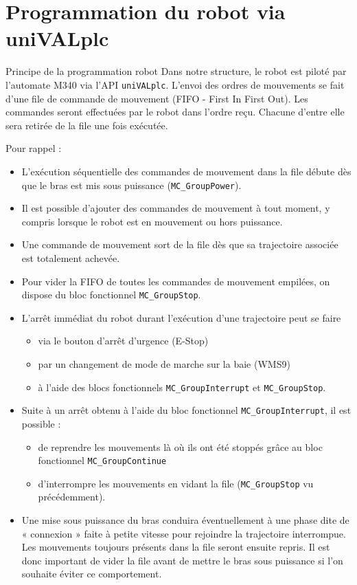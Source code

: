 \section{Programmation du robot via uniVALplc}
\begin{UPSTIinfor}{Principe de la programmation robot}
    Dans notre structure, le robot est piloté par l'automate M340 via l'API \texttt{uniVALplc}. L'envoi des ordres de mouvements se fait d'une file de commande de mouvement (FIFO - First In First Out). Les commandes seront effectuées par le robot dans l'ordre reçu. Chacune d'entre elle sera retirée de la file une fois exécutée.

    Pour rappel :
    \begin{itemize}
        \item L'exécution séquentielle des commandes de mouvement dans la file débute dès que le bras est mis sous puissance (\texttt{MC\_GroupPower}).
        \item Il est possible d'ajouter des commandes de mouvement à tout moment, y compris lorsque le robot est en mouvement ou hors puissance.
        \item Une commande de mouvement sort de la file dès que sa trajectoire associée est totalement achevée.
        \item Pour vider la FIFO de toutes les commandes de mouvement empilées, on dispose du bloc fonctionnel \texttt{MC\_GroupStop}.
        \item L'arrêt immédiat du robot durant l'exécution d'une trajectoire peut se faire
              \begin{itemize}
                  \item via le bouton d'arrêt d'urgence (E-Stop)
                  \item par un changement de mode de marche sur la baie (WMS9)
                  \item à l'aide des blocs fonctionnels \texttt{MC\_GroupInterrupt} et \texttt{MC\_GroupStop}.
              \end{itemize}
        \item Suite à un arrêt obtenu à l'aide du bloc fonctionnel \texttt{MC\_GroupInterrupt}, il est possible :
              \begin{itemize}
                  \item de reprendre les mouvements là où ils ont été stoppés grâce au bloc fonctionnel \texttt{MC\_GroupContinue}
                  \item d'interrompre les mouvements en vidant la file (\texttt{MC\_GroupStop} vu précédemment).
              \end{itemize}
        \item Une mise sous puissance du bras conduira éventuellement à une phase dite de « connexion » faite à petite vitesse pour rejoindre la trajectoire interrompue. Les mouvements toujours présents dans la file seront ensuite repris. Il est donc important de vider la file avant de mettre le bras sous puissance si l'on souhaite éviter ce comportement.
    \end{itemize}

\end{UPSTIinfor}

